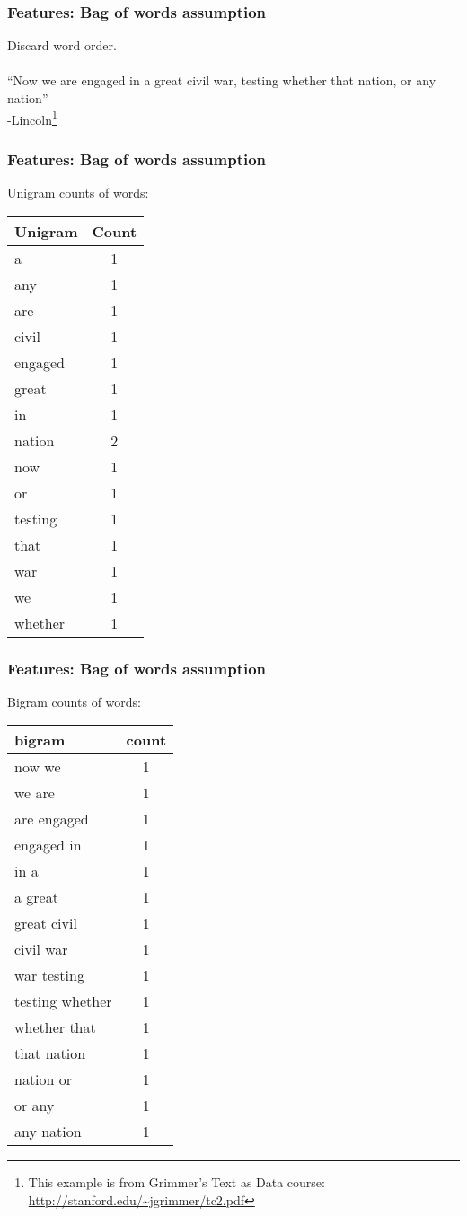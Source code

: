 \documentclass[]{beamer}
\begin{document}
\begin{frame}
  \frametitle{Features: Bag of words assumption}   %
Discard word order. \\~\\
``Now we are engaged in a great civil war, testing whether
that nation, or any nation''\\
-Lincoln\footnote{This example is from Grimmer's Text as Data course: \url{http://stanford.edu/~jgrimmer/tc2.pdf}}
\end{frame}

\begin{frame}
  \frametitle{Features: Bag of words assumption}   %
\small Unigram counts of words:
\begin{tabular}{lc}
Unigram&Count \\ \hline
a&1 \\
any&1 \\
are&1 \\
civil&1 \\
engaged&1 \\
great&1 \\
in&1 \\
nation&2 \\
now&1 \\
or&1 \\
testing&1 \\
that&1 \\
war&1 \\
we&1 \\
whether&1
\end{tabular}
\end{frame}

\begin{frame}
  \frametitle{Features: Bag of words assumption}   %
\small Bigram counts of words:
\begin{tabular}{lc}
bigram & count\\ \hline
now we & 1 \\ 
we are & 1 \\ 
are engaged & 1 \\ 
engaged in & 1 \\ 
in a & 1 \\ 
a great & 1 \\ 
great civil & 1 \\ 
civil war & 1 \\ 
war testing & 1 \\ 
testing whether & 1 \\ 
whether that & 1 \\ 
that nation & 1 \\ 
nation or & 1 \\ 
or any & 1 \\ 
any nation & 1
\end{tabular}
\end{frame}
\end{document}

